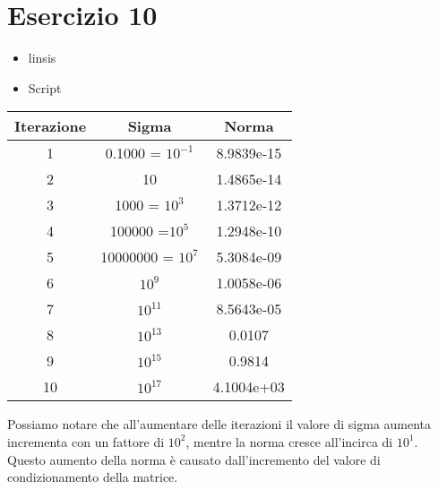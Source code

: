 \section{Esercizio 10}
\begin{itemize}
\item linsis

\item Script

\end{itemize}
\begin{table}[ht]
	\centering
	\small
	\begin{tabular}{| c | c | c |}
	\hline
	Iterazione & Sigma & Norma\\
	\hline
	 1 & 0.1000 = $10^{-1}$ & 8.9839e-15\\
	\hline
	2 & 10 & 1.4865e-14\\
	\hline
	3 & 1000 = $10^{3}$ & 1.3712e-12\\
	\hline
	4 & 100000 =$10^{5}$ & 1.2948e-10\\
	\hline
	 5 & 10000000 = $10^{7}$ & 5.3084e-09\\
	\hline
	6 & $10^{9}$ & 1.0058e-06\\
	\hline 
	7 &  $10^{11}$ & 8.5643e-05\\
	\hline
	8&  $10^{13}$ & 0.0107\\
	\hline
	9&  $10^{15}$ & 0.9814\\
	\hline
	10&  $10^{17}$ &4.1004e+03\\
	\hline
	\end{tabular}
\end{table}

Possiamo notare che all'aumentare delle iterazioni il valore di sigma aumenta incrementa con un fattore di $10^{2}$, mentre la norma cresce all'incirca di $10^{1}$. Questo aumento della norma è causato dall'incremento del valore di condizionamento della matrice.